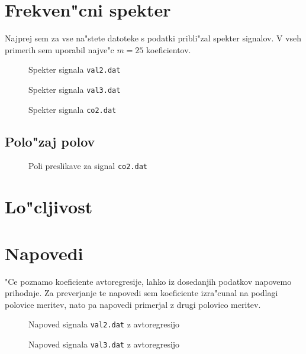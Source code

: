 \documentclass[a4paper,10pt]{article}
\begin{document}
\section{Frekven"cni spekter}

Najprej sem za vse na"stete datoteke s podatki pribli"zal spekter signalov. V vseh primerih sem uporabil najve"c $m=25$ koeficientov. 

\begin{figure}[h]
 
 \caption{Spekter signala \texttt{val2.dat}}
 \label{fig:psd-val2}
\end{figure}

\begin{figure}[h]
 
 \caption{Spekter signala \texttt{val3.dat}}
 \label{fig:psd-val3}
\end{figure}

\begin{figure}[h]
 
 \caption{Spekter signala \texttt{co2.dat}}
 \label{fig:psd-co2}
\end{figure}


\subsection{Polo"zaj polov}

\begin{figure}[h]
 
 \caption{Poli preslikave za signal \texttt{co2.dat}}
 \label{fig:roots-co2}
\end{figure}


\section{Lo"cljivost}

\section{Napovedi}

"Ce poznamo koeficiente avtoregresije, lahko iz dosedanjih podatkov napovemo prihodnje. Za preverjanje te napovedi sem koeficiente izra"cunal na podlagi polovice meritev, nato pa napovedi primerjal z drugi polovico meritev. 

\begin{figure}[h]
 
 \caption{Napoved signala \texttt{val2.dat} z avtoregresijo}
 \label{fig:napoved-val2}
\end{figure}

\begin{figure}[h]
 
 \caption{Napoved signala \texttt{val3.dat} z avtoregresijo}
 \label{fig:napoved-val3}
\end{figure}
\end{document}
